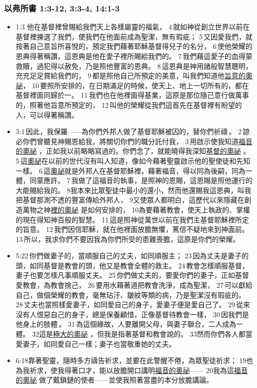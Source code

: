 \subsubsection{以弗所書 1:3-12, 3:3-4, 14:1-3}
\begin{itemize} 
\itemsep-.25em
\item 1:3 他在基督裡曾賜給我們天上各樣屬靈的福氣， 4 就如神從創立世界以前在基督裡揀選了我們，使我們在他面前成為聖潔，無有瑕疵； 5 又因愛我們，就按著自己意旨所喜悅的，預定我們藉著耶穌基督得兒子的名分， 6 使他榮耀的恩典得著稱讚。這恩典是他在愛子裡所賜給我們的。 7 我們藉這愛子的血得蒙救贖，過犯得以赦免，乃是照他豐富的恩典。 8 這恩典是神用諸般智慧聰明，充充足足賞給我們的， 9 都是照他自己所預定的美意，叫我們知道他\underline{旨意的奧祕}， 10 要照所安排的，在日期滿足的時候，使天上、地上一切所有的，都在基督裡面同歸於一。 11 我們也在他裡面得基業，這原是那位隨己意行做萬事的，照著他旨意所預定的， 12 叫他的榮耀從我們這首先在基督裡有盼望的人，可以得著稱讚。
\item 3:1 因此，我保羅——為你們外邦人做了基督耶穌被囚的，替你們祈禱 。 2 諒必你們曾聽見神賜恩給我，將關切你們的職分託付我， 3 用啟示使我知道\underline{福音的奧祕} ，正如我以前略略寫過的。你們念了，就能曉得我深知\underline{基督的奧祕} 。5 這\underline{奧祕}在以前的世代沒有叫人知道，像如今藉著聖靈啟示他的聖使徒和先知一樣。 6 這\underline{奧祕}就是外邦人在基督耶穌裡，藉著福音，得以同為後嗣，同為一體，同蒙應許。 7 我做了這福音的執事，是照神的恩賜，這恩賜是照他運行的大能賜給我的。 8我本來比眾聖徒中最小的還小，然而他還賜我這恩典，叫我把基督那測不透的豐富傳給外邦人， 9又使眾人都明白，這歷代以來隱藏在創造萬物之神\underline{裡的奧祕} 是如何安排的， 10為要藉著教會，使天上執政的、掌權的現在得知神百般的智慧。 11 這是照神從萬世以前在我們主基督耶穌裡所定的旨意。 12 我們因信耶穌，就在他裡面放膽無懼，篤信不疑地來到神面前。 13 所以，我求你們不要因我為你們所受的患難喪膽，這原是你們的榮耀。
\item  5:22 你們做妻子的，當順服自己的丈夫，如同順服主； 23 因為丈夫是妻子的頭，如同基督是教會的頭，他又是教會全體的救主。 24 教會怎樣順服基督，妻子也要怎樣凡事順服丈夫。 25 你們做丈夫的，要愛你們的妻子，正如基督愛教會，為教會捨己， 26 要用水藉著道把教會洗淨，成為聖潔， 27 可以獻給自己，做個榮耀的教會，毫無玷汙、皺紋等類的病，乃是聖潔沒有瑕疵的。 28 丈夫也當照樣愛妻子，如同愛自己的身子，愛妻子便是愛自己了。 29 從來沒有人恨惡自己的身子，總是保養顧惜，正像基督待教會一樣， 30 因我們是他身上的肢體 。 31 為這個緣故，人要離開父母，與妻子聯合，二人成為一體。 32這是\underline{極大的奧祕} ，但我是指著基督和教會說的。 33然而你們各人都當愛妻子，如同愛自己一樣；妻子也當敬重她的丈夫。
\item 6:18靠著聖靈，隨時多方禱告祈求，並要在此警醒不倦，為眾聖徒祈求； 19也為我祈求，使我得著口才，能以放膽開口講明\underline{福音的奧祕}—— 20我為這\underline{福音的奧祕} 做了戴鎖鏈的使者——並使我照著當盡的本分放膽講論。
\end{itemize} 

